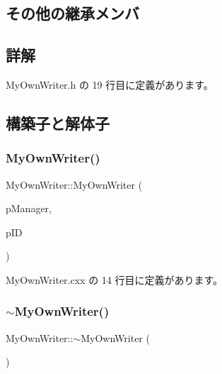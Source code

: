 \subsection*{その他の継承メンバ}


\subsection{詳解}


 My\+Own\+Writer.\+h の 19 行目に定義があります。



\subsection{構築子と解体子}
\mbox{\label{class_my_own_writer_adc6230f5f42e586d4c7ac744c858ebee}} 
\subsubsection{\texorpdfstring{My\+Own\+Writer()}{MyOwnWriter()}}
{\footnotesize\ttfamily My\+Own\+Writer\+::\+My\+Own\+Writer (\begin{DoxyParamCaption}\item[{\hyperlink{class_fbx_manager}{Fbx\+Manager} \&}]{p\+Manager,  }\item[{int}]{p\+ID }\end{DoxyParamCaption})}



 My\+Own\+Writer.\+cxx の 14 行目に定義があります。

\mbox{\label{class_my_own_writer_a5cfb2292b192574f3ed783ce5ce306a9}} 
\subsubsection{\texorpdfstring{$\sim$\+My\+Own\+Writer()}{~MyOwnWriter()}}
{\footnotesize\ttfamily My\+Own\+Writer\+::$\sim$\+My\+Own\+Writer (\begin{DoxyParamCaption}{ }\end{DoxyParamCaption})\hspace{0.3cm}{\ttfamily [virtual]}}



